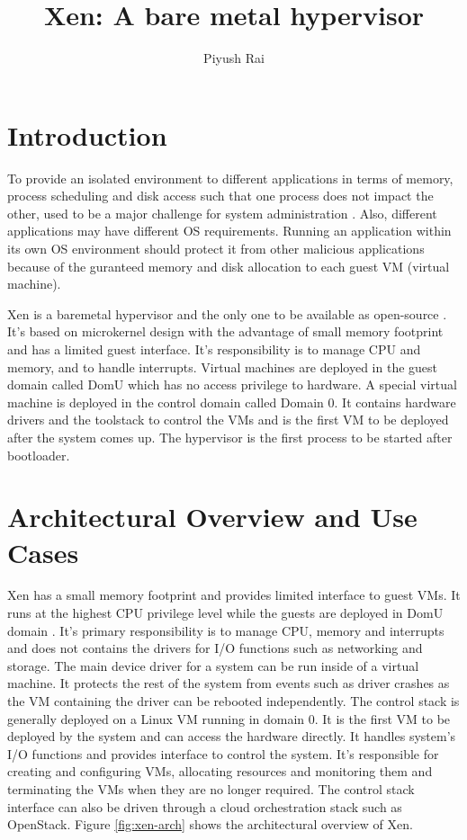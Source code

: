 \documentclass[9pt,twocolumn,twoside]{styles/osajnl}
\title{Xen: A bare metal hypervisor}
\author[1]{Piyush Rai}
\affil[1]{School of Informatics and Computing, Bloomington, IN 47408, U.S.A.}
\affil[*]{Corresponding authors: piyurai@iu.edu}
\affil[+]{HID - S17-IO-3014}
\begin{document}
\maketitle

\section{Introduction}

To provide an isolated environment to different applications in terms of memory, process scheduling and disk access such that one process does not impact the other, used to be a major challenge for system administration \cite{xenvirtualization}. Also, different applications may have different OS requirements. Running an application within its own OS environment should protect it from other malicious applications because of the guranteed memory and disk allocation to each guest VM (virtual machine).

Xen is a baremetal hypervisor and the only one to be available as open-source \cite{www-xen-wiki}. It's based on microkernel design with the advantage of small memory footprint and has a limited guest interface. It’s responsibility is to manage CPU and memory, and to handle interrupts. Virtual machines are deployed in the guest domain called DomU which has no access privilege to hardware. A special virtual machine is deployed in the control domain called Domain 0. It contains hardware drivers and the toolstack to control the VMs and is the first VM to be deployed after the system comes up. The hypervisor is the first process to be started after bootloader.

\section{Architectural Overview and Use Cases}

Xen has a small memory footprint and provides limited interface to guest VMs. It runs at the highest CPU privilege level while the guests are deployed in DomU domain \cite{www-xen-wiki}. It's primary responsibility is to manage CPU, memory and interrupts and does not contains the drivers for I/O functions such as networking and storage. The main device driver for a system can be run inside of a virtual machine. It protects the rest of the system from events such as driver crashes as the VM containing the driver can be rebooted independently. The control stack is generally deployed on a Linux VM running in domain 0. It is the first VM to be deployed by the system and can access the hardware directly. It handles system's I/O functions and provides interface to control the system. It's responsible for creating and configuring VMs, allocating resources and monitoring them and terminating the VMs when they are no longer required. The control stack interface can also be driven through a cloud orchestration stack such as OpenStack. Figure \ref{fig:xen-arch} shows the architectural overview of Xen.
\end{document}
